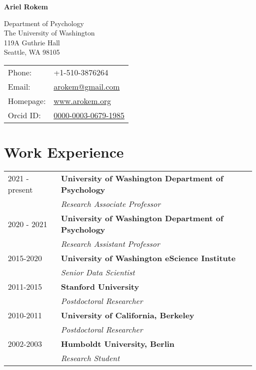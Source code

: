 \documentclass[11pt,fullpage]{article}
\def\name{Ariel Rokem}
\begin{document}
%

\centerline{\Large \bf \name}

\vspace{0.25in}

\begin{minipage}{0.50\linewidth}
  Department of Psychology\\
  The University of Washington\\
  119A Guthrie Hall\\
  Seattle, WA 98105\\
\end{minipage}
\begin{minipage}{0.50\linewidth}
  \begin{tabular}{ll}
    Phone: & +1-510-3876264 \\
    Email: & \href{mailto:arokem@gmail.com}{arokem@gmail.com} \\
    Homepage: & \href{http://arokem.org/}{www.arokem.org} \\
    Orcid ID: & \href{http://orcid.org/0000-0003-0679-1985}{0000-0003-0679-1985} \\
  \end{tabular}
\end{minipage}

\section*{Work Experience}
\begin{tabular}{ll}

  2021 -  present & {\bf University of Washington Department of Psychology}\\
  & \emph{Research Associate Professor}\\
  2020 - 2021 & {\bf University of Washington Department of Psychology}\\
  & \emph{Research Assistant Professor}\\
  2015-2020 & {\bf University of Washington eScience Institute}\\
  & \emph{Senior Data Scientist}\\
  2011-2015 & {\bf Stanford University}\\
  & \emph{Postdoctoral Researcher}\\
  2010-2011 & {\bf University of California, Berkeley}\\
  & \emph{Postdoctoral Researcher}\\
  2002-2003 & {\bf Humboldt University, Berlin}\\
  & \emph{Research Student}\\

\end{tabular}
\end{document}
